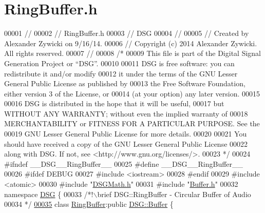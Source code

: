 \hypertarget{_ring_buffer_8h_source}{\section{Ring\+Buffer.\+h}
\label{_ring_buffer_8h_source}
}

\begin{DoxyCode}
00001 \textcolor{comment}{//}
00002 \textcolor{comment}{//  RingBuffer.h}
00003 \textcolor{comment}{//  DSG}
00004 \textcolor{comment}{//}
00005 \textcolor{comment}{//  Created by Alexander Zywicki on 9/16/14.}
00006 \textcolor{comment}{//  Copyright (c) 2014 Alexander Zywicki. All rights reserved.}
00007 \textcolor{comment}{//}
00008 \textcolor{comment}{/*}
00009 \textcolor{comment}{ This file is part of the Digital Signal Generation Project or “DSG”.}
00010 \textcolor{comment}{}
00011 \textcolor{comment}{ DSG is free software: you can redistribute it and/or modify}
00012 \textcolor{comment}{ it under the terms of the GNU Lesser General Public License as published by}
00013 \textcolor{comment}{ the Free Software Foundation, either version 3 of the License, or}
00014 \textcolor{comment}{ (at your option) any later version.}
00015 \textcolor{comment}{}
00016 \textcolor{comment}{ DSG is distributed in the hope that it will be useful,}
00017 \textcolor{comment}{ but WITHOUT ANY WARRANTY; without even the implied warranty of}
00018 \textcolor{comment}{ MERCHANTABILITY or FITNESS FOR A PARTICULAR PURPOSE.  See the}
00019 \textcolor{comment}{ GNU Lesser General Public License for more details.}
00020 \textcolor{comment}{}
00021 \textcolor{comment}{ You should have received a copy of the GNU Lesser General Public License}
00022 \textcolor{comment}{ along with DSG.  If not, see <http://www.gnu.org/licenses/>.}
00023 \textcolor{comment}{ */}
00024 \textcolor{preprocessor}{#ifndef \_\_DSG\_\_RingBuffer\_\_}
00025 \textcolor{preprocessor}{#define \_\_DSG\_\_RingBuffer\_\_}
00026 \textcolor{preprocessor}{#ifdef DEBUG}
00027 \textcolor{preprocessor}{#include <iostream>}
00028 \textcolor{preprocessor}{#endif}
00029 \textcolor{preprocessor}{#include <atomic>}
00030 \textcolor{preprocessor}{#include "\hyperlink{_d_s_g_math_8h}{DSGMath.h}"}
00031 \textcolor{preprocessor}{#include "\hyperlink{_buffer_8h}{Buffer.h}"}
00032 \textcolor{keyword}{namespace }\hyperlink{namespace_d_s_g}{DSG} \{\textcolor{comment}{}
00033 \textcolor{comment}{    /*!\(\backslash\)brief DSG::RingBuffer - Circular Buffer of Audio}
00034 \textcolor{comment}{     */}
\hypertarget{_ring_buffer_8h_source_l00035}{}\hyperlink{class_d_s_g_1_1_ring_buffer}{00035}     \textcolor{keyword}{class }\hyperlink{class_d_s_g_1_1_ring_buffer}{RingBuffer}:\textcolor{keyword}{public} \hyperlink{class_d_s_g_1_1_buffer}{DSG::Buffer} \{

\end{DoxyCode}
